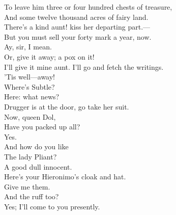 \documentclass[a4paper,oneside,12pt]{memoir}
\begin{document}
\begin{drama*}
To leave him three or four hundred chests of treasure,\\
And some twelve thousand acres of fairy land.\\
\subtlespeaks There's a kind aunt! kiss her departing part.---\\
But you must sell your forty mark a year, now.\\
\dapperspeaks Ay, sir, I mean.\\
\subtlespeaks {} Or, give it away; a pox on it!\\
\dapperspeaks I'll give it mine aunt. I'll go and fetch the writings.\\
\subtlespeaks 'Tis well---away!\\
\facespeaks {} Where's Subtle?\\
\subtlespeaks {} Here: what news?\\
\facespeaks Drugger is at the door, go take her suit.\\
 Now, queen Dol,\\
Have you packed up all?\\
\dolspeaks {} Yes.\\
\facespeaks {} And how do you like\\
The lady Pliant?\\
\dolspeaks {} A good dull innocent.\\
\subtlespeaks Here's your Hieronimo's cloak and hat.\\
\facespeaks {} Give me them.\\
\subtlespeaks And the ruff too?\\
\facespeaks {} Yes; I'll come to you presently.\\

\scene


\end{drama*}
\end{document}
